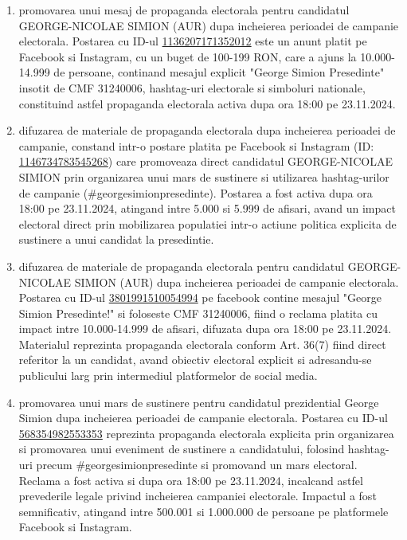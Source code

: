 \documentclass[a4paper,12pt]{article}
\begin{document}
\begin{enumerate}[leftmargin=*, label=\arabic*.)]
    \item promovarea unui mesaj de propaganda electorala pentru candidatul GEORGE-NICOLAE SIMION (AUR) dupa incheierea perioadei de campanie electorala. Postarea cu ID-ul \href{https://www.facebook.com/ads/library/?id=1136207171352012}{1136207171352012} este un anunt platit pe Facebook si Instagram, cu un buget de 100-199 RON, care a ajuns la 10.000-14.999 de persoane, continand mesajul explicit "George Simion Presedinte" insotit de CMF 31240006, hashtag-uri electorale si simboluri nationale, constituind astfel propaganda electorala activa dupa ora 18:00 pe 23.11.2024.
    \item difuzarea de materiale de propaganda electorala dupa incheierea perioadei de campanie, constand intr-o postare platita pe Facebook si Instagram (ID: \href{https://www.facebook.com/ads/library/?id=1146734783545268}{1146734783545268}) care promoveaza direct candidatul GEORGE-NICOLAE SIMION prin organizarea unui mars de sustinere si utilizarea hashtag-urilor de campanie (\#georgesimionpresedinte). Postarea a fost activa dupa ora 18:00 pe 23.11.2024, atingand intre 5.000 si 5.999 de afisari, avand un impact electoral direct prin mobilizarea populatiei intr-o actiune politica explicita de sustinere a unui candidat la presedintie.
    \item difuzarea de materiale de propaganda electorala pentru candidatul GEORGE-NICOLAE SIMION (AUR) dupa incheierea perioadei de campanie electorala. Postarea cu ID-ul \href{https://www.facebook.com/ads/library/?id=3801991510054994}{3801991510054994} pe facebook contine mesajul "George Simion Presedinte!" si foloseste CMF 31240006, fiind o reclama platita cu impact intre 10.000-14.999 de afisari, difuzata dupa ora 18:00 pe 23.11.2024. Materialul reprezinta propaganda electorala conform Art. 36(7) fiind direct referitor la un candidat, avand obiectiv electoral explicit si adresandu-se publicului larg prin intermediul platformelor de social media.
    \item promovarea unui mars de sustinere pentru candidatul prezidential George Simion dupa incheierea perioadei de campanie electorala. Postarea cu ID-ul \href{https://www.facebook.com/ads/library/?id=568354982553353}{568354982553353} reprezinta propaganda electorala explicita prin organizarea si promovarea unui eveniment de sustinere a candidatului, folosind hashtag-uri precum \#georgesimionpresedinte si promovand un mars electoral. Reclama a fost activa si dupa ora 18:00 pe 23.11.2024, incalcand astfel prevederile legale privind incheierea campaniei electorale. Impactul a fost semnificativ, atingand intre 500.001 si 1.000.000 de persoane pe platformele Facebook si Instagram.

\end{enumerate}
\end{document}
